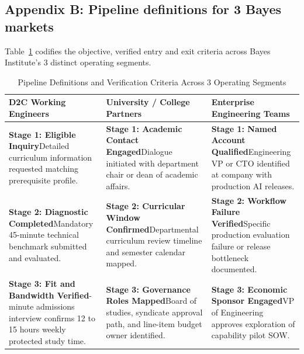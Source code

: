 \subsection*{Appendix B: Pipeline definitions for 3 Bayes markets}

Table~\ref{tab:pipeline_markets} codifies the objective, verified entry and exit criteria across Bayes Institute's 3 distinct operating segments.

\begin{table}[t]
\centering
\small
\caption{Pipeline Definitions and Verification Criteria Across 3 Operating Segments}
\label{tab:pipeline_markets}
\vspace{4pt}
\begin{tabular}{p{4.8cm}p{5.2cm}p{5.2cm}}
\hline
\textbf{D2C Working Engineers} & \textbf{University / College Partners} & \textbf{Enterprise Engineering Teams} \\
\hline
\textbf{Stage 1: Eligible Inquiry}\newline Detailed curriculum information requested matching prerequisite profile. & \textbf{Stage 1: Academic Contact Engaged}\newline Dialogue initiated with department chair or dean of academic affairs. & \textbf{Stage 1: Named Account Qualified}\newline Engineering VP or CTO identified at company with production AI releases. \\
\hline
\textbf{Stage 2: Diagnostic Completed}\newline Mandatory 45-minute technical benchmark submitted and evaluated. & \textbf{Stage 2: Curricular Window Confirmed}\newline Departmental curriculum review timeline and semester calendar mapped. & \textbf{Stage 2: Workflow Failure Verified}\newline Specific production evaluation failure or release bottleneck documented. \\
\hline
\textbf{Stage 3: Fit and Bandwidth Verified}\newline 20-minute admissions interview confirms 12 to 15 hours weekly protected study time. & \textbf{Stage 3: Governance Roles Mapped}\newline Board of studies, syndicate approval path, and line-item budget owner identified. & \textbf{Stage 3: Economic Sponsor Engaged}\newline VP of Engineering approves exploration of capability pilot SOW. \\

\end{tabular}
\end{table}
